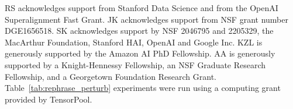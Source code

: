 \begin{ack}
RS acknowledges support from Stanford Data Science and from the OpenAI Superalignment Fast Grant.
JK acknowledges support from NSF grant number DGE1656518.
SK acknowledges support by NSF 2046795 and 2205329, the MacArthur Foundation, Stanford HAI, OpenAI and Google Inc.
KZL is generously supported by the Amazon AI PhD Fellowship.
AA is generously supported by a Knight-Hennessy Fellowship, an NSF Graduate Research Fellowship, and a Georgetown Foundation Research Grant.
Table~\ref{tab:rephrase_perturb} experiments were run using a computing grant provided by TensorPool.
\end{ack}
